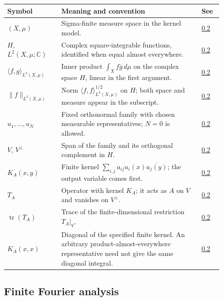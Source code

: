 \begin{longtable}{p{0.22\linewidth}p{0.58\linewidth}p{0.08\linewidth}}
\textbf{Symbol} & \textbf{Meaning and convention} & \textbf{See} \\ \hline
\((X,\mu)\) & Sigma-finite measure space in the kernel model. & \hyperref[finite-kernel-model]{0.2} \\
\(H\), \(L^2(X,\mu;\mathbb C)\) & Complex square-integrable functions, identified when equal almost everywhere. & \hyperref[finite-kernel-model]{0.2} \\
$\langle f,g\rangle_{L^2(X,\mu)}$ & Inner product $\int_X f\overline g\,d\mu$ on the complex space $H$, linear in the first argument. & \hyperref[finite-kernel-model]{0.2} \\
$\|f\|_{L^2(X,\mu)}$ & Norm $\langle f,f\rangle_{L^2(X,\mu)}^{1/2}$ on $H$; both space and measure appear in the subscript. & \hyperref[finite-kernel-model]{0.2} \\
\(u_1,\ldots,u_N\) & Fixed orthonormal family with chosen measurable representatives; \(N=0\) is allowed. & \hyperref[finite-kernel-model]{0.2} \\
\(V\), \(V^\perp\) & Span of the family and its orthogonal complement in \(H\). & \hyperref[finite-kernel-model]{0.2} \\
\(K_A(x,y)\) & Finite kernel \(\sum_{i,j}a_{ij}u_i(x)\overline{u_j(y)}\); the output variable comes first. & \hyperref[finite-kernel-operator]{0.2} \\
\(T_A\) & Operator with kernel \(K_A\); it acts as \(A\) on \(V\) and vanishes on \(V^\perp\). & \hyperref[finite-kernel-operator]{0.2} \\
\(\operatorname{tr}(T_A)\) & Trace of the finite-dimensional restriction \(T_A|_V\). & \hyperref[finite-kernel-trace-definition]{0.2} \\
\(K_A(x,x)\) & Diagonal of the specified finite kernel. An arbitrary product-almost-everywhere representative need not give the same diagonal integral. & \hyperref[kernel-diagonal-representatives]{0.2} \\
\end{longtable}

\subsection*{Finite Fourier analysis}\label{v1a-notation-fourier}

